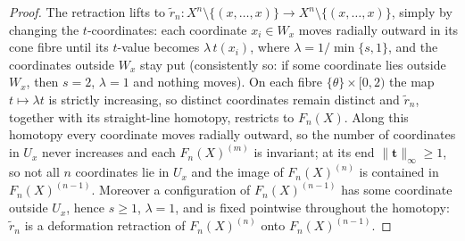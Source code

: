 \documentclass[reqno]{amsart}
\theoremstyle{definition}
\newcommand\bft{\mathbf{t}}
\renewcommand{\tilde}{\widetilde}
\numberwithin{equation}{section}
\begin{document}
\begin{proof}
The retraction lifts to
\(\tilde r_n\colon X^n\setminus\{(x,\dots,x)\}\to
X^n\setminus\{(x,\dots,x)\}\), simply by changing the
\(t\)-coordinates: each coordinate \(x_i\in W_x\) moves radially
outward in its cone fibre until its \(t\)-value becomes
\(\lambda\,t(x_i)\), where \(\lambda=1/\min\{s,1\}\), and the
coordinates outside \(W_x\) stay put (consistently so: if some
coordinate lies outside \(W_x\), then \(s=2\), \(\lambda=1\) and
nothing moves). On each fibre \(\{\theta\}\times[0,2)\) the map
\(t\mapsto\lambda t\) is strictly increasing, so distinct
coordinates remain distinct and \(\tilde r_n\), together with
its straight-line homotopy, restricts to \(F_n(X)\). Along this
homotopy every coordinate moves radially outward, so the number
of coordinates in \(U_x\) never increases and each
\(F_n(X)^{(m)}\) is invariant; at its end
\(\|\bft\|_\infty\ge1\), so not all \(n\) coordinates lie in
\(U_x\) and the image of \(F_n(X)^{(n)}\) is contained in
\(F_n(X)^{(n-1)}\). Moreover a configuration of
\(F_n(X)^{(n-1)}\) has some coordinate outside \(U_x\), hence
\(s\ge1\), \(\lambda=1\), and is fixed pointwise throughout the
homotopy: \(\tilde r_n\) is a deformation retraction of
\(F_n(X)^{(n)}\) onto \(F_n(X)^{(n-1)}\).


\end{proof}
\end{document}
